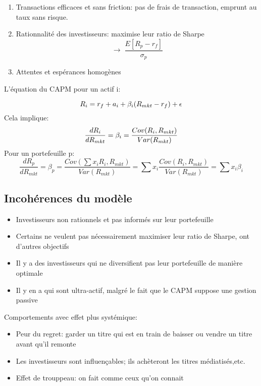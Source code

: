 \begin{enumerate}
\def\labelenumi{\arabic{enumi}.}

\item
  Transactions efficaces et sans friction: pas de frais de transaction,
  emprunt au taux sans risque.
\item
  Rationnalité des investisseurs: maximise leur ratio de Sharpe \[
  \rightarrow\; \frac{E[R_p- r_f]}{\sigma_p}
  \]
\item
  Attentes et espérances homogènes
\end{enumerate}

L'équation du CAPM pour un actif \(\mathrm{i}\):

\[
R_i =r_f+a_i+\beta_i(R_{mkt}-r_f)+\epsilon\\  
\] Cela implique:\\
\[
\frac{dR_i}{d R_{mkt}}=\beta_i=\frac{Cov(R_i,R_{mkt})}{Var(R_{mkt})}\\    
\] Pour un portefeuille p:\\
\[
\frac{dR_p}{d R_{mkt}}=\beta_p=\frac{Cov(\sum x_i R_i,R_{mkt})}{Var(R_{mkt})}=\sum x_i \frac{Cov(R_i,R_{mkt})}{Var(R_{mkt})}=\sum x_i \beta_i
\]

\subsection*{Incohérences du modèle}\label{incoherences-du-modele}

\begin{itemize}

\item
  Investisseurs non rationnels et pas informés sur leur portefeuille
\item
  Certains ne veulent pas nécessairement maximiser leur ratio de Sharpe,
  ont d'autres objectifs
\item
  Il y a des investisseurs qui ne diversifient pas leur portefeuille de
  manière optimale
\item
  Il y en a qui sont ultra-actif, malgré le fait que le CAPM suppose une
  gestion passive
\end{itemize}

Comportements avec effet plus systémique:

\begin{itemize}

\item
  Peur du regret: garder un titre qui est en train de baisser ou vendre
  un titre avant qu'il remonte
\item
  Les investisseurs sont influençables; ils achèteront les titres
  médiatisés,etc.
\item
  Effet de trouppeau: on fait comme ceux qu'on connait
\end{itemize}

